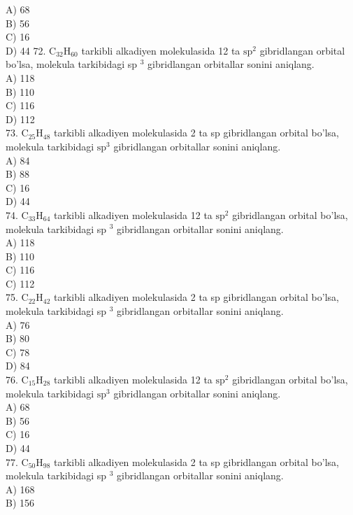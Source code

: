 A) 68\\
B) 56\\
C) 16\\
D) 44
72. $\mathrm{C}_{32} \mathrm{H}_{60}$ tarkibli alkadiyen molekulasida 12 ta $\mathrm{sp}^{2}$ gibridlangan orbital bo'lsa, molekula tarkibidagi sp ${ }^{3}$ gibridlangan orbitallar sonini aniqlang.\\
A) 118\\
B) 110\\
C) 116\\
D) 112\\
73. $\mathrm{C}_{25} \mathrm{H}_{48}$ tarkibli alkadiyen molekulasida 2 ta sp gibridlangan orbital bo'lsa, molekula tarkibidagi $\mathrm{sp}^{3}$ gibridlangan orbitallar sonini aniqlang.\\
A) 84\\
B) 88\\
C) 16\\
D) 44\\
74. $\mathrm{C}_{33} \mathrm{H}_{64}$ tarkibli alkadiyen molekulasida 12 ta $\mathrm{sp}^{2}$ gibridlangan orbital bo'lsa, molekula tarkibidagi sp ${ }^{3}$ gibridlangan orbitallar sonini aniqlang.\\
A) 118\\
B) 110\\
C) 116\\
C) 112\\
75. $\mathrm{C}_{22} \mathrm{H}_{42}$ tarkibli alkadiyen molekulasida 2 ta sp gibridlangan orbital bo'lsa, molekula tarkibidagi sp ${ }^{3}$ gibridlangan orbitallar sonini aniqlang.\\
A) 76\\
B) 80\\
C) 78\\
D) 84\\
76. $\mathrm{C}_{15} \mathrm{H}_{28}$ tarkibli alkadiyen molekulasida 12 ta $\mathrm{sp}^{2}$ gibridlangan orbital bo'lsa, molekula tarkibidagi $\mathrm{sp}^{3}$ gibridlangan orbitallar sonini aniqlang.\\
A) 68\\
B) 56\\
C) 16\\
D) 44\\
77. $\mathrm{C}_{50} \mathrm{H}_{98}$ tarkibli alkadiyen molekulasida 2 ta sp gibridlangan orbital bo'lsa, molekula tarkibidagi sp ${ }^{3}$ gibridlangan orbitallar sonini aniqlang.\\
A) 168\\
B) 156\\
